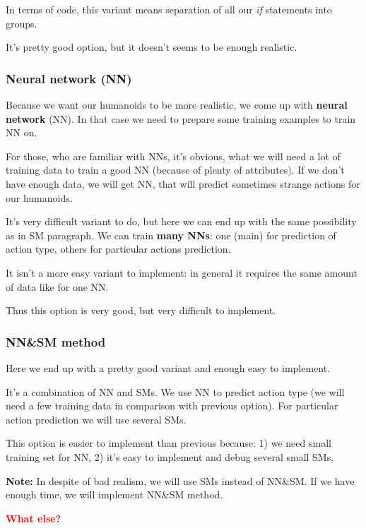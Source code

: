 \documentclass[12pt]{article}
\newcommand{\note}[1]{\textbf{\color{blue}Note:} #1}
\newcommand{\todo}[1]
{
    \marginpar
    {
        \textbf{\small{\textcolor{red}{#1}}}
    }
}
\begin{document}
				In terms of code, this variant means separation of all our \textit{if} statements into groups.

				It's pretty good option, but it doesn't seems to be enough realistic.

			\subsubsection{Neural network (NN)}
				Because we want our humanoids to be more realistic, we come up with \textbf{neural network} (NN). In that case we need to prepare some training examples to train NN on.

				For those, who are familiar with NNs, it's obvious, what we will need a lot of training data to train a good NN (because of plenty of attributes). If we don't have enough data, we will get NN, that will predict sometimes strange actions for our humanoids.

				It's very difficult variant to do, but here we can end up with the same possibility as in SM paragraph. We can train \textbf{many NNs}: one (main) for prediction of action type, others for particular actions prediction.

				It isn't a more easy variant to implement: in general it requires the same amount of data like for one NN.

				Thus this option is very good, but very difficult to implement.

			\subsubsection{NN\&SM method}
				Here we end up with a pretty good variant and enough easy to implement.

				It's a combination of NN and SMs. We use NN to predict action type (we will need a few training data in comparison with previous option). For particular action prediction we will use several SMs.

				This option is easier to implement than previous because: 1) we need small training set for NN, 2) it's easy to implement and debug several small SMs.

				\note{In despite of bad realism, we will use SMs instead of NN\&SM. If we have enough time, we will implement NN\&SM method.}

		\todo{What else?}
\end{document}
